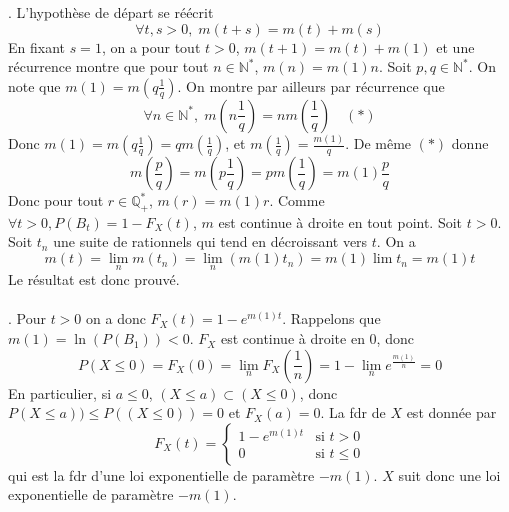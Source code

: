 \documentclass{report}
\begin{document}
. L'hypothèse de départ se réécrit $$\forall t,s>0,\; m(t+s)= m(t)+m(s)$$
En fixant $s=1$, on a pour tout $t>0$, $m(t+1)=m(t)+m(1)$ et une récurrence montre que pour tout $n\in \mathbb N^*$, $m(n)=m(1)n$.\newline
Soit $p,q\in \mathbb N^*$. On note que $m(1)=m(q\frac 1q)$. On montre par ailleurs par récurrence que $$\forall n\in \mathbb N^*, \; m(n\frac 1q)=nm(\frac 1q)  \quad (*)$$ Donc $m(1)=m(q\frac 1q)= q m(\frac 1q)$, et  $m(\frac 1q)=\frac{m(1)}{q}$. \newline
De même $(*)$ donne $$m(\frac pq)= m(p\frac 1q)=pm(\frac 1q)=m(1)\frac pq$$
Donc pour tout $r\in \mathbb Q_+^*$, $m(r)=m(1)r$.\newline
Comme $\forall t>0, P(B_t)=1-F_X(t)$, $m$ est continue à droite en tout point.\newline
Soit $t>0$. Soit $t_n$ une suite de rationnels qui tend en décroissant vers $t$. On a $$ m(t) = \lim_n m(t_n)= \lim_n (m(1)t_n) = m(1) \lim t_n = m(1)t$$
Le résultat est donc prouvé. \\ \\
. Pour $t>0$ on a donc $F_X(t)=1-e^{m(1)t}$. Rappelons que $m(1)=\ln (P(B_1))<0$. $F_X$ est continue à droite en $0$, donc $$P(X\leq 0) = F_X(0) = \lim_n F_X(\frac 1n) = 1- \lim_n e^{\frac{m(1)}{n}} =0 $$
En particulier, si $a\leq 0$, $(X\leq a)\subset (X\leq 0)$, donc $P(X\leq a))\leq P((X\leq 0))=0$ et $F_X(a)=0$.\newline
La fdr de $X$ est donnée par $$ F_X(t) = \begin{cases}
1-e^{m(1)t} & \text{si } t>0 \\
0 & \text{si } t\leq 0
\end{cases}$$ qui est la fdr d'une loi exponentielle de paramètre $-m(1)$. $X$ suit donc une loi exponentielle de paramètre $-m(1)$.
\end{document}
